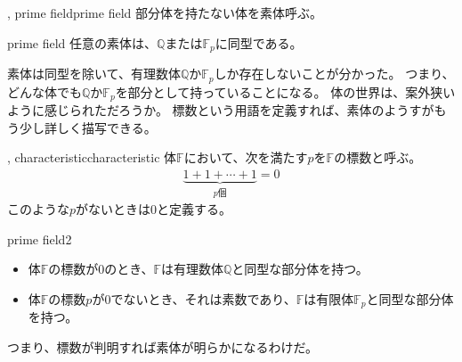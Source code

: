 \begin{Defi}{, prime field}{prime field}
部分体を持たない体を素体呼ぶ。
\end{Defi}

\begin{Prop}{}{prime field}
任意の素体は、$\mathbb{Q}$または$\mathbb{F}_p$に同型である。
\end{Prop}

素体は同型を除いて、有理数体$\mathbb{Q}$か$\mathbb{F}_p$しか存在しないことが分かった。
つまり、どんな体でも$\mathbb{Q}$か$\mathbb{F}_p$を部分として持っていることになる。
体の世界は、案外狭いように感じられただろうか。
標数という用語を定義すれば、素体のようすがもう少し詳しく描写できる。

\begin{Defi}{, characteristic}{characteristic}
体$\mathbb{F}$において、次を満たす$p$を$\mathbb{F}$の標数と呼ぶ。
\begin{align*}
\underbrace{1 + 1 + \cdots + 1}_{p \mbox{個}} = 0
\end{align*}
このような$p$がないときは$0$と定義する。
\end{Defi}

\begin{Prop}{}{prime field2}\;
\begin{itemize}
\item 体$\mathbb{F}$の標数が$0$のとき、$\mathbb{F}$は有理数体$\mathbb{Q}$と同型な部分体を持つ。
\item 体$\mathbb{F}$の標数$p$が$0$でないとき、それは素数であり、$\mathbb{F}$は有限体$\mathbb{F}_p$と同型な部分体を持つ。
\end{itemize}
\end{Prop}

つまり、標数が判明すれば素体が明らかになるわけだ。

